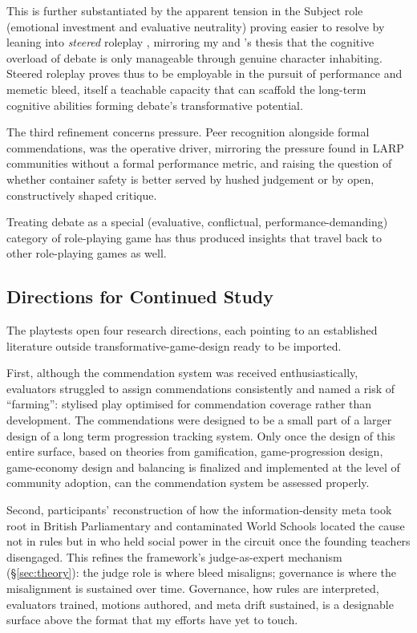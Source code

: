 This is further substantiated by the apparent tension in the Subject role (emotional investment and evaluative neutrality) proving easier to resolve by leaning into \textit{steered} roleplay \parencite{montola2015steering, pohjola2015steering}, mirroring my and \textcite{seo2022good}'s thesis that the cognitive overload of debate is only manageable through genuine character inhabiting. Steered roleplay proves thus to be employable in the pursuit of performance and memetic bleed, itself a teachable capacity that can scaffold the long-term cognitive abilities forming debate's transformative potential.

The third refinement concerns pressure. Peer recognition alongside formal commendations, was the operative driver, mirroring the pressure found in LARP communities without a formal performance metric, and raising the question of whether container safety is better served by hushed judgement or by open, constructively shaped critique.

Treating debate as a special (evaluative, conflictual, performance-demanding) category of role-playing game has thus produced insights that travel back to other role-playing games as well.

\subsection{Directions for Continued Study}
\label{sec:further-study}

The playtests open four research directions, each pointing to an established literature outside transformative-game-design ready to be imported.

First, although the commendation system was received enthusiastically, evaluators struggled to assign commendations consistently and named a risk of ``farming'': stylised play optimised for commendation coverage rather than development. The commendations were designed to be a small part of a larger design of a long term progression tracking system. Only once the design of this entire surface, based on theories from gamification, game-progression design, game-economy design and balancing is finalized and implemented at the level of community adoption, can the commendation system be assessed properly.

Second, participants' reconstruction of how the information-density meta took root in British Parliamentary and contaminated World Schools located the cause not in rules but in who held social power in the circuit once the founding teachers disengaged. This refines the framework's judge-as-expert mechanism (§\ref{sec:theory}): the judge role is where bleed misaligns; governance is where the misalignment is sustained over time. Governance, how rules are interpreted, evaluators trained, motions authored, and meta drift sustained, is a designable surface above the format that my efforts have yet to touch. 

